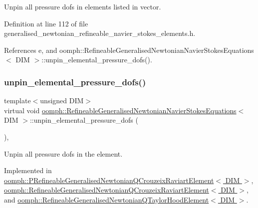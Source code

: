 Unpin all pressure dofs in elements listed in vector. 



Definition at line 112 of file generalised\+\_\+newtonian\+\_\+refineable\+\_\+navier\+\_\+stokes\+\_\+elements.\+h.



References e, and oomph\+::\+Refineable\+Generalised\+Newtonian\+Navier\+Stokes\+Equations$<$ D\+I\+M $>$\+::unpin\+\_\+elemental\+\_\+pressure\+\_\+dofs().

\mbox{\label{classoomph_1_1RefineableGeneralisedNewtonianNavierStokesEquations_a5e80fae3c3c4373e082867a49cc78ad0}} 
\subsubsection{\texorpdfstring{unpin\+\_\+elemental\+\_\+pressure\+\_\+dofs()}{unpin\_elemental\_pressure\_dofs()}}
{\footnotesize\ttfamily template$<$unsigned D\+IM$>$ \\
virtual void \hyperlink{classoomph_1_1RefineableGeneralisedNewtonianNavierStokesEquations}{oomph\+::\+Refineable\+Generalised\+Newtonian\+Navier\+Stokes\+Equations}$<$ D\+IM $>$\+::unpin\+\_\+elemental\+\_\+pressure\+\_\+dofs (\begin{DoxyParamCaption}{ }\end{DoxyParamCaption})\hspace{0.3cm}{\ttfamily [protected]}, {}}



Unpin all pressure dofs in the element. 



Implemented in \hyperlink{classoomph_1_1PRefineableGeneralisedNewtonianQCrouzeixRaviartElement_a2e603c22bdef7f5a9ebf82dd46a3fae2}{oomph\+::\+P\+Refineable\+Generalised\+Newtonian\+Q\+Crouzeix\+Raviart\+Element$<$ D\+I\+M $>$}, \hyperlink{classoomph_1_1RefineableGeneralisedNewtonianQCrouzeixRaviartElement_a5f0ca1585eef5cae43ea9eafde474991}{oomph\+::\+Refineable\+Generalised\+Newtonian\+Q\+Crouzeix\+Raviart\+Element$<$ D\+I\+M $>$}, and \hyperlink{classoomph_1_1RefineableGeneralisedNewtonianQTaylorHoodElement_aab4ac8ef8f49d09cd1a32e292e0ca621}{oomph\+::\+Refineable\+Generalised\+Newtonian\+Q\+Taylor\+Hood\+Element$<$ D\+I\+M $>$}.




